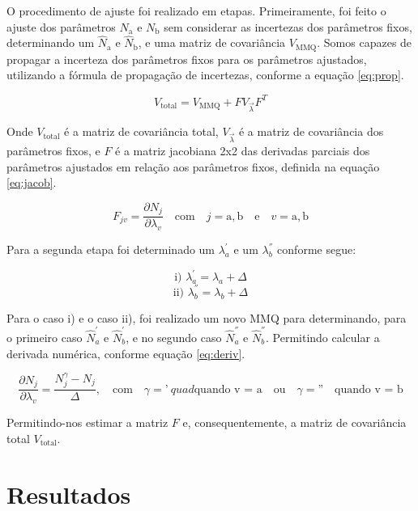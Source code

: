 O procedimento de ajuste foi realizado em etapas. Primeiramente, foi feito o ajuste dos parâmetros $N_{\text{a}}$ e $N_{\text{b}}$ sem considerar as incertezas dos parâmetros fixos, determinando um $\hat{N}_{\text{a}}$ e $\hat{N}_{\text{b}}$, e uma matriz de covariância $V_{\text{MMQ}}$. Somos capazes de propagar a incerteza dos parâmetros fixos para os parâmetros ajustados, utilizando a fórmula de propagação de incertezas, conforme a equação \eqref{eq:prop}.

\begin{equation}
    V_{\text{total}} = V_{\text{MMQ}} +  F V_{\vec{\lambda}} F^T
    \label{eq:prop}
\end{equation}

Onde $V_{\text{total}}$ é a matriz de covariância total, $V_{\vec{\lambda}}$ é a matriz de covariância dos parâmetros fixos, e $F$ é a matriz jacobiana 2x2 das derivadas parciais dos parâmetros ajustados em relação aos parâmetros fixos, definida na equação \eqref{eq:jacob}.

\begin{equation}
    F_{jv} = \frac{\partial N_j}{\partial \lambda_v}
    \quad
    \text{com} \quad j = \text{a},\text{b} \quad \text{e} \quad v = \text{a},\text{b}
    \label{eq:jacob} 
\end{equation}

Para a segunda etapa foi determinado um $\lambda^{'}_{a}$ e um $\lambda^{''}_{b}$ conforme segue: 

$$\text{i) }\lambda^{'}_{a} = \lambda_{a} + \Delta$$ 
$$\text{ii) }\lambda^{''}_{b} = \lambda_{b} + \Delta $$

Para o caso i) e o caso ii), foi realizado um novo MMQ para determinando, para o primeiro caso $\hat{N}^{'}_{a}$ e $\hat{N}^{'}_{b}$, e no segundo caso $\hat{N}^{''}_{a}$ e $\hat{N}^{''}_{b}$. Permitindo calcular a derivada numérica, conforme equação \eqref{eq:deriv}.

\begin{equation}
    \frac{\partial N_j}{\partial \lambda_v} = \frac{N^{\gamma}_j - N_j}{\Delta}, \quad \text{com} \quad \gamma = \text{'}\ quad \text{quando v = a} \quad \text{ou} \quad \gamma = \text{''} \quad \text{quando v = b}
    \label{eq:deriv}
\end{equation}

Permitindo-nos estimar a matriz $F$ e, consequentemente, a matriz de covariância total $V_{\text{total}}$.

\section{Resultados}

